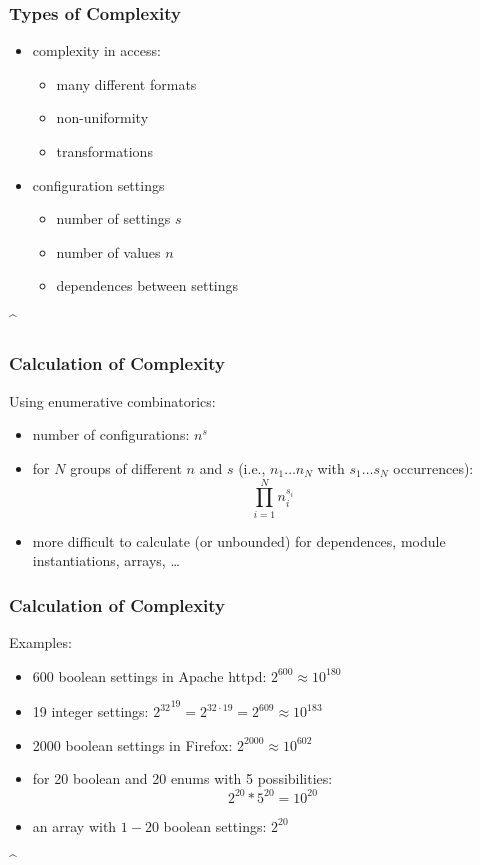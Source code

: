 \documentclass{beamer}
\begin{document}
\begin{frame}
	\frametitle{Types of Complexity}
	\begin{itemize}
	\item complexity in access:
		\begin{itemize}
		\item many different formats
		\item non-uniformity
		\item transformations
		\end{itemize}
	\item configuration settings
		\begin{itemize}
		\item number of settings $s$
		\item number of values $n$
		\item dependences between settings
		\end{itemize}
	\end{itemize}
\end{frame}

\lstDeleteShortInline^
\begin{frame}
	\frametitle{Calculation of Complexity}

	Using enumerative combinatorics:
	\begin{itemize}
	\item number of configurations: $n^s$
	\item for $N$ groups of different $n$ and $s$ (i.e., $n_1 \dots n_N$ with $s_1 \dots s_N$ occurrences):  $$\prod_{i=1}^{N} n_i^{s_i}$$
	\item more difficult to calculate (or unbounded) for dependences, module instantiations, arrays, \dots
	\end{itemize}
\end{frame}

\begin{frame}
	\frametitle{Calculation of Complexity}

	Examples:
	\begin{itemize}
	\item 600 boolean settings in Apache httpd:
	\pause
	$2^{600} \approx 10^{180}$

	\item 19 integer settings:
	\pause
	${2^{32}}^{19} = 2^{32 \cdot 19} = 2^{609} \approx 10^{183}$

	\item 2000 boolean settings in Firefox:
	\pause
	$2^{2000} \approx 10^{602}$

	\item for 20 boolean and 20 enums with 5 possibilities:
	\pause
	$$2^{20}*5^{20} = 10^{20}$$

	\item an array with $1-20$ boolean settings:
	\pause
	$2^{20}$
	\end{itemize}
\end{frame}
\lstMakeShortInline[postbreak=,keywordstyle={}]^
\end{document}
